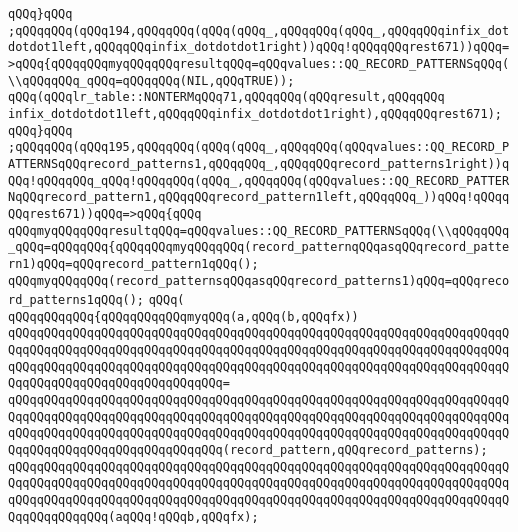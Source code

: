 \verb|qQQq}qQQq|\newline
\verb|;qQQqqQQq(qQQq194,qQQqqQQq(qQQq(qQQq_,qQQqqQQq(qQQq_,qQQqqQQqinfix_dotdotdot1left,qQQqqQQqinfix_dotdotdot1right))qQQq!qQQqqQQqrest671))qQQq=>qQQq{qQQqqQQqmyqQQqqQQqresultqQQq=qQQqvalues::QQ_RECORD_PATTERNSqQQq(\\qQQqqQQq_qQQq=qQQqqQQq(NIL,qQQqTRUE));|\newline
\verb|qQQq(qQQqlr_table::NONTERMqQQq71,qQQqqQQq(qQQqresult,qQQqqQQq|\newline
\verb|infix_dotdotdot1left,qQQqqQQqinfix_dotdotdot1right),qQQqqQQqrest671);|\newline
\verb|qQQq}qQQq|\newline
\verb|;qQQqqQQq(qQQq195,qQQqqQQq(qQQq(qQQq_,qQQqqQQq(qQQqvalues::QQ_RECORD_PATTERNSqQQqrecord_patterns1,qQQqqQQq_,qQQqqQQqrecord_patterns1right))qQQq!qQQqqQQq_qQQq!qQQqqQQq(qQQq_,qQQqqQQq(qQQqvalues::QQ_RECORD_PATTERNqQQqrecord_pattern1,qQQqqQQqrecord_pattern1left,qQQqqQQq_))qQQq!qQQqqQQqrest671))qQQq=>qQQq{qQQq|\newline
\verb|qQQqmyqQQqqQQqresultqQQq=qQQqvalues::QQ_RECORD_PATTERNSqQQq(\\qQQqqQQq_qQQq=qQQqqQQq{qQQqqQQqmyqQQqqQQq(record_patternqQQqasqQQqrecord_pattern1)qQQq=qQQqrecord_pattern1qQQq();|\newline
\verb|qQQqmyqQQqqQQq(record_patternsqQQqasqQQqrecord_patterns1)qQQq=qQQqrecord_patterns1qQQq();|\newline
\verb|qQQq(|\newline
\verb|qQQqqQQqqQQq{qQQqqQQqqQQqmyqQQq(a,qQQq(b,qQQqfx))|\newline
\verb|qQQqqQQqqQQqqQQqqQQqqQQqqQQqqQQqqQQqqQQqqQQqqQQqqQQqqQQqqQQqqQQqqQQqqQQqqQQqqQQqqQQqqQQqqQQqqQQqqQQqqQQqqQQqqQQqqQQqqQQqqQQqqQQqqQQqqQQqqQQqqQQqqQQqqQQqqQQqqQQqqQQqqQQqqQQqqQQqqQQqqQQqqQQqqQQqqQQqqQQqqQQqqQQqqQQqqQQqqQQqqQQqqQQqqQQqqQQqqQQq=|\newline
\verb|qQQqqQQqqQQqqQQqqQQqqQQqqQQqqQQqqQQqqQQqqQQqqQQqqQQqqQQqqQQqqQQqqQQqqQQqqQQqqQQqqQQqqQQqqQQqqQQqqQQqqQQqqQQqqQQqqQQqqQQqqQQqqQQqqQQqqQQqqQQqqQQqqQQqqQQqqQQqqQQqqQQqqQQqqQQqqQQqqQQqqQQqqQQqqQQqqQQqqQQqqQQqqQQqqQQqqQQqqQQqqQQqqQQqqQQqqQQqqQQq(record_pattern,qQQqrecord_patterns);|\newline
\newline
\verb|qQQqqQQqqQQqqQQqqQQqqQQqqQQqqQQqqQQqqQQqqQQqqQQqqQQqqQQqqQQqqQQqqQQqqQQqqQQqqQQqqQQqqQQqqQQqqQQqqQQqqQQqqQQqqQQqqQQqqQQqqQQqqQQqqQQqqQQqqQQqqQQqqQQqqQQqqQQqqQQqqQQqqQQqqQQqqQQqqQQqqQQqqQQqqQQqqQQqqQQqqQQqqQQqqQQqqQQqqQQqqQQq(aqQQq!qQQqb,qQQqfx);|\newline
